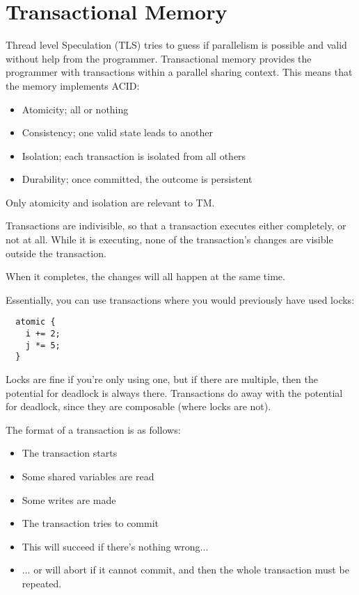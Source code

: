 
\section{Transactional Memory}

Thread level Speculation (TLS) tries to guess if parallelism is
possible and valid without help from the programmer. Transactional
memory provides the programmer with transactions within a parallel
sharing context. This means that the memory implements ACID:

\begin{itemize}
\item Atomicity; all or nothing
\item Consistency; one valid state leads to another
\item Isolation; each transaction is isolated from all others 
\item Durability; once committed, the outcome is persistent
\end{itemize}

Only atomicity and isolation are relevant to TM.

Transactions are indivisible, so that a transaction executes either
completely, or not at all. While it is executing, none of the
transaction's changes are visible outside the transaction.

When it completes, the changes will all happen at the same time.

Essentially, you can use transactions where you would previously have
used locks:

\begin{verbatim}
  atomic {
    i += 2;
    j *= 5;
  }
\end{verbatim}

Locks are fine if you're only using one, but if there are multiple,
then the potential for deadlock is always there. Transactions do away
with the potential for deadlock, since they are composable (where
locks are not).

The format of a transaction is as follows:

\begin{itemize}
\item The transaction starts
\item Some shared variables are read
\item Some writes are made
\item The transaction tries to commit
\item This will succeed if there's nothing wrong...
\item ... or will abort if it cannot commit, and then the whole transaction must be repeated.
\end{itemize}

